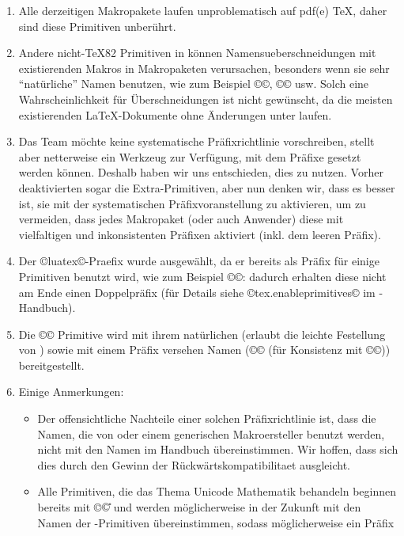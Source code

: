 \documentclass{lltxdoc}
\begin{document}
\begin{myquote}
  \begin{enumerate}
    \item Alle derzeitigen Makropakete laufen unproblematisch auf pdf(e) TeX, 
daher sind diese Primitiven unberührt.
    \item Andere nicht-TeX82 Primitiven in \luatex können 
Namensueberschneidungen mit existierenden Makros in Makropaketen verursachen, 
besonders wenn sie sehr ``natürliche'' Namen benutzen, wie zum Beispiel 
©\outputbox©, ©\mathstyle© usw. Solch eine Wahrscheinlichkeit für 
Überschneidungen ist nicht gewünscht, da die meisten existierenden 
LaTeX-Dokumente ohne Änderungen unter \luatex laufen.
    \item Das \luatex Team möchte keine systematische Präfixrichtlinie
 vorschreiben, stellt aber netterweise ein Werkzeug zur Verfügung, mit dem 
Präfixe gesetzt werden können. Deshalb haben wir uns entschieden, dies zu 
nutzen. Vorher deaktivierten sogar die Extra-Primitiven, aber nun denken wir, 
dass es besser ist, sie mit der systematischen Präfixvoranstellung zu 
aktivieren, um zu vermeiden, dass jedes Makropaket (oder auch Anwender) diese 
mit vielfaltigen und inkonsistenten Präfixen aktiviert (inkl. dem leeren 
Präfix).
    \item Der ©luatex©-Praefix wurde ausgewählt, da er bereits als Präfix für 
einige Primitiven benutzt wird, wie zum Beispiel ©\luatexversion©: dadurch 
erhalten diese nicht am Ende einen Doppelpräfix  (für Details siehe 
©tex.enableprimitives© im \luatex-Handbuch).
    \item  Die ©\directlua© Primitive wird mit ihrem natürlichen (erlaubt die 
leichte Festellung von \luatex ) sowie mit einem Präfix versehen Namen  
(©\luatexdirectlua© (für Konsistenz mit ©\luatexlatelua©)) bereitgestellt.
    \item Einige Anmerkungen:
      \begin{itemize}
        \item Der offensichtliche Nachteile einer solchen Präfixrichtlinie ist, 
dass die Namen, die von \latex oder einem generischen Makroersteller benutzt 
werden, nicht mit den Namen im Handbuch übereinstimmen. Wir hoffen, dass sich 
dies durch den Gewinn der Rückwärtskompatibilitaet ausgleicht.
        \item Alle Primitiven, die das Thema Unicode Mathematik behandeln 
beginnen bereits mit ©\U© und werden möglicherweise in der Zukunft mit den 
Namen der \xetex-Primitiven übereinstimmen, sodass möglicherweise ein Präfix 

\end{itemize}
\end{enumerate}
\end{myquote}
\end{document}
